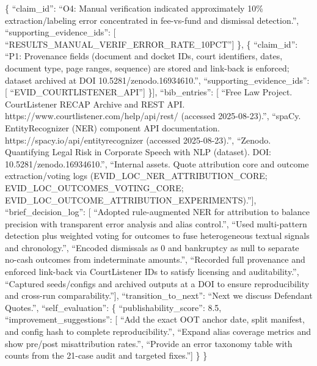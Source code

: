 \{
``claim\_id'': ``O4: Manual verification indicated approximately 10\% extraction/labeling error concentrated in fee-vs-fund and dismissal detection.'',
``supporting\_evidence\_ids'': {[}
``RESULTS\_MANUAL\_VERIF\_ERROR\_RATE\_10PCT''{]}
\},
\{
``claim\_id'': ``P1: Provenance fields (document and docket IDs, court identifiers, dates, document type, page ranges, sequence) are stored and link-back is enforced; dataset archived at DOI 10.5281/zenodo.16934610.'',
``supporting\_evidence\_ids'': {[}
``EVID\_COURTLISTENER\_API''{]}
\}{]},
``bib\_entries'': {[}
``Free Law Project. CourtListener RECAP Archive and REST API. https://www.courtlistener.com/help/api/rest/ (accessed 2025-08-23).'',
``spaCy. EntityRecognizer (NER) component API documentation. https://spacy.io/api/entityrecognizer (accessed 2025-08-23).'',
``Zenodo. Quantifying Legal Risk in Corporate Speech with NLP (dataset). DOI: 10.5281/zenodo.16934610.'',
``Internal assets. Quote attribution core and outcome extraction/voting logs (EVID\_LOC\_NER\_ATTRIBUTION\_CORE; EVID\_LOC\_OUTCOMES\_VOTING\_CORE; EVID\_LOC\_OUTCOME\_ATTRIBUTION\_EXPERIMENTS).''{]},
``brief\_decision\_log'': {[}
``Adopted rule-augmented NER for attribution to balance precision with transparent error analysis and alias control.'',
``Used multi-pattern detection plus weighted voting for outcomes to fuse heterogeneous textual signals and chronology.'',
``Encoded dismissals as 0 and bankruptcy as null to separate no-cash outcomes from indeterminate amounts.'',
``Recorded full provenance and enforced link-back via CourtListener IDs to satisfy licensing and auditability.'',
``Captured seeds/configs and archived outputs at a DOI to ensure reproducibility and cross-run comparability.''{]},
``transition\_to\_next'': ``Next we discuss Defendant Quotes.'',
``self\_evaluation'': \{
``publishability\_score'': 8.5,
``improvement\_suggestions'': {[}
``Add the exact OOT anchor date, split manifest, and config hash to complete reproducibility.'',
``Expand alias coverage metrics and show pre/post misattribution rates.'',
``Provide an error taxonomy table with counts from the 21-case audit and targeted fixes.''{]}
\}
\}
